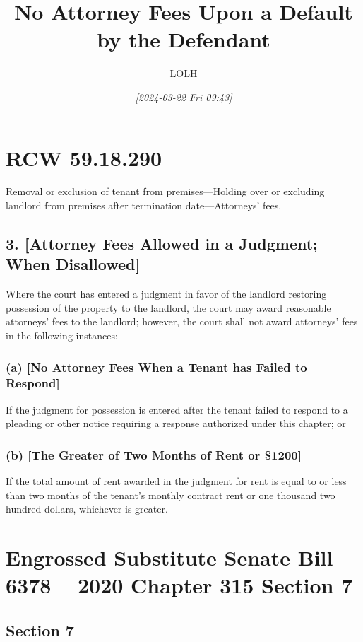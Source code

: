 \documentclass[11pt]{article}
\author{LOLH}
\date{\textit{[2024-03-22 Fri 09:43]}}
\title{No Attorney Fees Upon a Default by the Defendant}
\begin{document}
\maketitle
\tableofcontents


\section{RCW 59.18.290}
\label{sec:org327492b}
Removal or exclusion of tenant from premises—Holding over or excluding landlord from premises after termination date—Attorneys' fees.

\subsection{3. [Attorney Fees Allowed in a Judgment; When Disallowed]}
\label{sec:orgaa6ab97}
Where the court has entered a judgment in favor of the landlord restoring possession of the property to the landlord, the court may award reasonable attorneys' fees to the landlord; however, the court shall not award attorneys' fees in the following instances:

\subsubsection{(a) [No Attorney Fees When a Tenant has Failed to Respond]}
\label{sec:orgf6151b0}
If the judgment for possession is entered after the tenant failed to respond to a pleading or other notice requiring a response authorized under this chapter; or

\subsubsection{(b) [The Greater of Two Months of Rent or \$1200]}
\label{sec:org5932ebc}
If the total amount of rent awarded in the judgment for rent is equal to or less than two months of the tenant's monthly contract rent or one thousand two hundred dollars, whichever is greater.

\section{Engrossed Substitute Senate Bill 6378 -- 2020 Chapter 315 Section 7}
\label{sec:org87e134f}

\subsection{Section 7}
\label{sec:org58a4762}
\end{document}
